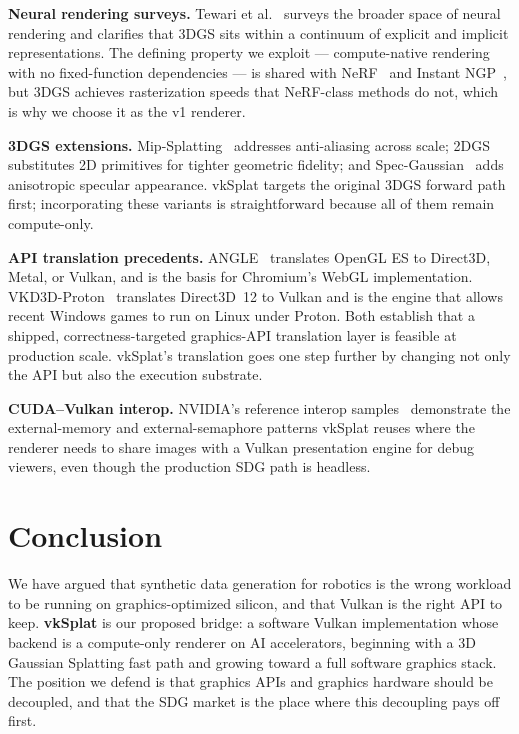 \documentclass[10pt,journal]{IEEEtran}
\begin{document}
\textbf{Neural rendering surveys.} Tewari et al.~\cite{tewari2022advances}
surveys the broader space of neural rendering and clarifies that
3DGS sits within a continuum of explicit and implicit
representations. The defining property we exploit ---
compute-native rendering with no fixed-function dependencies --- is
shared with NeRF~\cite{mildenhall2020nerf} and Instant
NGP~\cite{mueller2022instant}, but 3DGS achieves rasterization speeds
that NeRF-class methods do not, which is why we choose it as the v1
renderer.

\textbf{3DGS extensions.} Mip-Splatting~\cite{yu2024mip}
addresses anti-aliasing across scale; 2DGS~\cite{huang20242dgs}
substitutes 2D primitives for tighter geometric fidelity; and
Spec-Gaussian~\cite{yang2024specgaussian} adds anisotropic specular
appearance. vkSplat targets the original 3DGS forward path first;
incorporating these variants is straightforward because all of them
remain compute-only.

\textbf{API translation precedents.} ANGLE~\cite{angle} translates
OpenGL ES to Direct3D, Metal, or Vulkan, and is the basis for
Chromium's WebGL implementation. VKD3D-Proton~\cite{vkd3dproton}
translates Direct3D~12 to Vulkan and is the engine that allows recent
Windows games to run on Linux under Proton. Both establish that a
shipped, correctness-targeted graphics-API translation layer is
feasible at production scale. vkSplat's translation goes one step
further by changing not only the API but also the execution
substrate.

\textbf{CUDA--Vulkan interop.} NVIDIA's reference interop
samples~\cite{nvidia2020vkcuda} demonstrate the external-memory and
external-semaphore patterns vkSplat reuses where the renderer needs
to share images with a Vulkan presentation engine for debug viewers,
even though the production SDG path is headless.

\section{Conclusion}

We have argued that synthetic data generation for robotics is the wrong
workload to be running on graphics-optimized silicon, and that Vulkan is
the right API to keep. \textbf{vkSplat} is our proposed bridge: a
software Vulkan implementation whose backend is a compute-only renderer
on AI accelerators, beginning with a 3D Gaussian Splatting fast path
and growing toward a full software graphics stack. The position we
defend is that graphics APIs and graphics hardware should be decoupled,
and that the SDG market is the place where this decoupling pays off
first.
\end{document}
